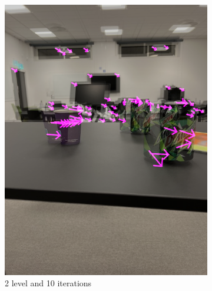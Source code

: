 \documentclass{article}
\begin{document}
\begin{figure}[H]
\begin{subfigure}{0.48\textwidth}
            \includegraphics[width=1\textwidth]{2levels-10iterations.png}
            \caption{2 level and 10 iterations}
            \label{fig:sub:flow-low-it}
        \end{subfigure}  
        \begin{subfigure}{0.48\textwidth}
            \centering

\end{subfigure}
\end{figure}
\end{document}
